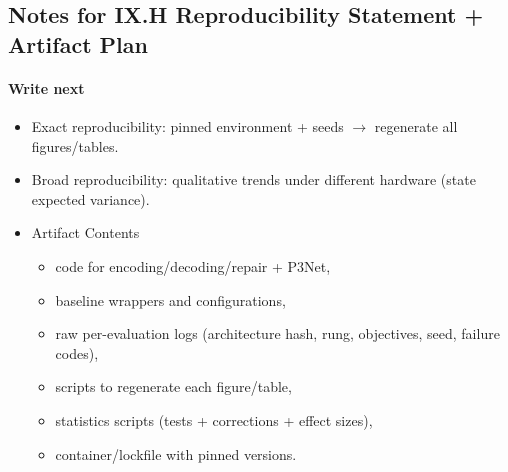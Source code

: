 \subsection*{Notes for IX.H Reproducibility Statement + Artifact Plan}
\paragraph{Write next}
\begin{itemize}
  \item Exact reproducibility: pinned environment + seeds $\rightarrow$ regenerate all figures/tables.
  \item Broad reproducibility: qualitative trends under different hardware (state expected variance).
  \item Artifact Contents
  \begin{itemize}
    \item code for encoding/decoding/repair + P3Net,
    \item baseline wrappers and configurations,
    \item raw per-evaluation logs (architecture hash, rung, objectives, seed, failure codes),
    \item scripts to regenerate each figure/table,
    \item statistics scripts (tests + corrections + effect sizes),
    \item container/lockfile with pinned versions.
  \end{itemize}
\end{itemize}
